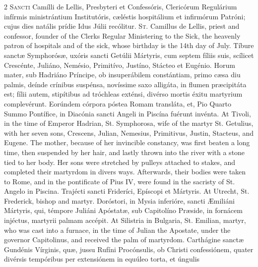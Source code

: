\begin{paracol}{2}
\lettrine[lines=2]{S}{ancti} Camílli de 
 Lellis, Presbyteri et Confessóris, Clericórum Regulárium infírmis 
 ministrántium Institutóris, cæléstis hospitálium et infirmórum Patróni; 
 cujus dies natális prídie Idus Júlii recólitur.
\switchcolumn
{}
\lettrine[lines=2]{S}{t.} Camillus de Lellis, priest and 
 confessor, founder of the Clerks Regular Ministering to the Sick, the 
 heavenly patron of hospitals and of the sick, whose birthday is the 14th day 
 of July.
\switchcolumn*
{}
Tíbure sanctæ 
 Symphorósæ, uxóris sancti Getúlii Mártyris, cum septem fíliis suis, scílicet 
 Crescénte, Juliáno, Nemésio, Primitívo, Justíno, Stácteo et Eugénio. 
 Horum mater, sub Hadriáno Príncipe, ob insuperábilem constántiam, primo cæsa 
 diu palmis, deínde crínibus suspénsa, novíssime saxo alligáta, in flumen 
 præcipitáta est; fílii autem, stipítibus ad tróchleas exténsi, divérso 
 mortis éxitu martyrium complevérunt. Eorúndem córpora póstea 
 Romam transláta, et, Pio Quarto Summo Pontífice, in Diacónia sancti Angeli 
 in Piscína fuérunt invénta.
\switchcolumn
{}
At Tivoli, in the time of Emperor 
 Hadrian, St. Symphorosa, wife of the martyr St. Getulius, with her seven 
 sons, Crescens, Julian, Nemesius, Primitivus, Justin, Stacteus, and Eugene. 
 The mother, because of her invincible constancy, was first beaten a long 
 time, then suspended by her hair, and lastly thrown into the river with a 
 stone tied to her body. Her sons were stretched by pulleys attached to 
 stakes, and completed their martyrdom in divers ways. Afterwards, 
 their bodies were taken to Rome, and in the pontificate of Pius IV, were 
 found in the sacristy of St. Angelo in Piscina.
\switchcolumn*
{}
Trajécti sancti 
 Frideríci, Epíscopi et Mártyris.
\switchcolumn
{}
At Utrecht, St. Frederick, bishop 
 and martyr.
\switchcolumn*
{}
Doróstori, in Mysia 
 inferióre, sancti Æmiliáni Mártyris, qui, témpore Juliáni Apóstatæ, sub 
 Capitolíno Præside, in fornácem injéctus, martyrii palmam accépit.
\switchcolumn
{}
At Silistria in Bulgaria, St. 
 Emilian, martyr, who was cast into a furnace, in the time of Julian the 
 Apostate, under the governor Capitolinus, and received the palm of 
 martyrdom.
\switchcolumn*
{}
Carthágine sanctæ 
 Gundénis Vírginis, quæ, jussu Rufíni Procónsulis, ob Christi confessiónem, 
 quater divérsis tempóribus per extensiónem in equúleo torta, et úngulis 

\end{paracol}
